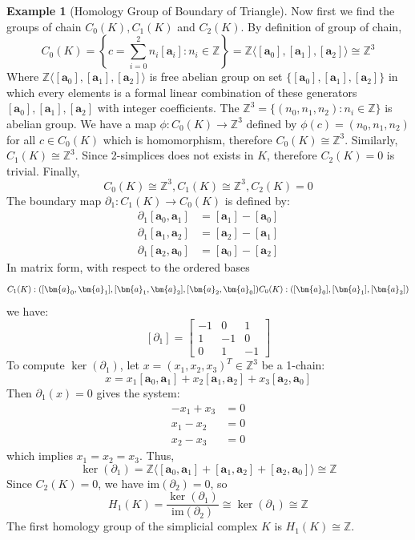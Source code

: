 \documentclass[12pt,oneside,reqno]{amsart}
\theoremstyle{plain}
\theoremstyle{definition}
\newtheorem{example}{Example}[section]
\theoremstyle{remark}
\newcommand{\mbb}[1]{\mathbb{#1}}
\newcommand{\0}{{\textbf{0}}}
\begin{document}
\begin{example}[Homology Group of Boundary of Triangle]
Now first we find the groups of chain $C_{0}(K),  C_{1}(K)$ and $ C_{2}(K)$. By definition of group of chain,
\begin{equation}\label{eq:0 chain group}
C_{0}(K) = \left \{c = \sum_{i = 0}^{2}n_{i}[\bm{a}_{i}] \colon n_{i} \in \mbb{Z} \right \} = \mbb{Z}\langle [\bm{a}_0], [\bm{a}_1], [\bm{a}_2] \rangle \cong \mbb{Z}^3
\end{equation}
Where $\mbb{Z}\langle [\bm{a}_0], [\bm{a}_1], [\bm{a}_2] \rangle$ is free abelian group on set $\{[\bm{a}_0], [\bm{a}_1], [\bm{a}_2]\}$ in which every elements is a formal linear combination of these generators $[\bm{a}_0], [\bm{a}_1], [\bm{a}_2]$ with integer coefficients. The $\mbb{Z}^{3} = \{(n_0, n_1, n_2) \colon n_i \in \mbb{Z}\}$ is abelian group. We have a map $\phi \colon C_{0}(K) \to \mbb{Z}^3$ defined by $\phi(c) = (n_0, n_1, n_2)$ for all $c \in C_{0}(K)$ which is homomorphism, therefore $C_{0}(K) \cong \mbb{Z}^3$. Similarly, $C_{1}(K) \cong \mbb{Z}^3$. Since 2-simplices does not exists in $K$, therefore $C_{2}(K) = 0$ is trivial. Finally,
\begin{equation}\label{eq:chain groups}
C_{0}(K) \cong \mbb{Z}^3, C_{1}(K) \cong \mbb{Z}^3,  
C_{2}(K) = 0  
\end{equation}
The boundary map $\partial_1 \colon C_1(K) \to C_0(K)$ is defined by:
\begin{align*}
\partial_1[\bm{a}_0, \bm{a}_1] &= [\bm{a}_1] - [\bm{a}_0] \\
\partial_1[\bm{a}_1, \bm{a}_2] &= [\bm{a}_2] - [\bm{a}_1] \\
\partial_1[\bm{a}_2, \bm{a}_0] &= [\bm{a}_0] - [\bm{a}_2]
\end{align*}
In matrix form, with respect to the ordered bases 
\[
C_1(K): ([\bm{a}_0, \bm{a}_1], [\bm{a}_1, \bm{a}_2], [\bm{a}_2, \bm{a}_0]) \\
C_0(K): ([\bm{a}_0], [\bm{a}_1], [\bm{a}_2])
\]
we have:
\[
[\partial_1] =
\begin{bmatrix}
-1 &  0 &  1 \\
 1 & -1 &  0 \\
 0 &  1 & -1
\end{bmatrix}
\]
To compute $\ker(\partial_1)$, let $x = (x_1, x_2, x_3)^T \in \mathbb{Z}^3$ be a 1-chain:
\[
x = x_1[\bm{a}_0, \bm{a}_1] + x_2[\bm{a}_1, \bm{a}_2] + x_3[\bm{a}_2, \bm{a}_0]
\]
Then $\partial_1(x) = 0$ gives the system:
\begin{align*}
-x_1 + x_3 &= 0 \\
x_1 - x_2 &= 0 \\
x_2 - x_3 &= 0
\end{align*}
which implies $x_1 = x_2 = x_3$. Thus,
\[
\ker(\partial_1) = \mathbb{Z} \langle [\bm{a}_0, \bm{a}_1] + [\bm{a}_1, \bm{a}_2] + [\bm{a}_2, \bm{a}_0] \rangle \cong \mathbb{Z}
\]
Since $C_2(K) = 0$, we have $\mathrm{im}(\partial_2) = 0$, so
\[
H_1(K) = \dfrac{\ker(\partial_1)}{\mathrm{im}(\partial_2)} \cong \ker(\partial_1) \cong \mathbb{Z}
\]
The first homology group of the simplicial complex $K$ is $H_1(K) \cong \mathbb{Z}$.
\end{example}
\end{document}
